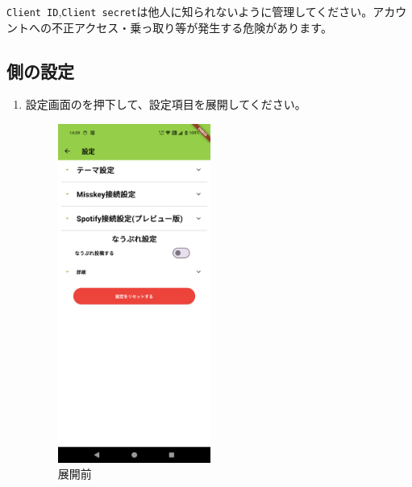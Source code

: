             \begin{itembox}[c]{}
                \texttt{Client ID},\texttt{Client secret}は他人に知られないように管理してください。アカウントへの不正アクセス・乗っ取り等が発生する危険があります。
            \end{itembox}

    \newpage
    \subsection{\bj 側の設定}
    \label{sec:spotify6}
        \begin{enumerate}
            \item 設定画面のを押下して、設定項目を展開してください。
                \begin{figure}[htbp]
                    \begin{minipage}[b]{0.45\linewidth}
                        \centering
                        \includegraphics[width=5cm]{./pictures/Spotify10.png}
                        \caption{展開前}
                        \label{img:spotify10}
                    \end{minipage}
                    \begin{minipage}[b]{0.45\linewidth}
                        \centering

\end{minipage}
\end{figure}
\end{enumerate}
